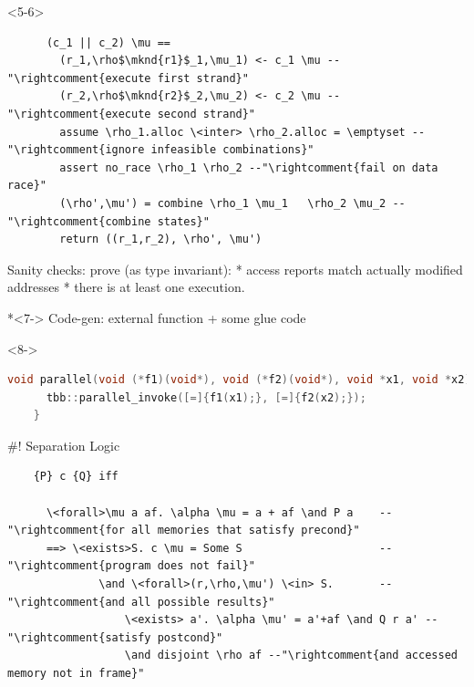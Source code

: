 \documentclass[fleqn]{beamer}
\begin{document}
    \begin{onlyenv}<5-6>
    \begin{lstlisting}
      (c_1 || c_2) \mu ==
        (r_1,\rho$\mknd{r1}$_1,\mu_1) <- c_1 \mu --"\rightcomment{execute first strand}"
        (r_2,\rho$\mknd{r2}$_2,\mu_2) <- c_2 \mu --"\rightcomment{execute second strand}"
        assume \rho_1.alloc \<inter> \rho_2.alloc = \emptyset --"\rightcomment{ignore infeasible combinations}"
        assert no_race \rho_1 \rho_2 --"\rightcomment{fail on data race}"
        (\rho',\mu') = combine \rho_1 \mu_1   \rho_2 \mu_2 --"\rightcomment{combine states}"
        return ((r_1,r_2), \rho', \mu')
    \end{lstlisting}

    Sanity checks: prove (as type invariant):
      * access reports match actually modified addresses
      * there is at least one execution.


%

    \end{onlyenv}
  *<7-> Code-gen: external function + some glue code
    \begin{onlyenv}<8->
    \small
    \begin{lstlisting}[language=C++]
    void parallel(void (*f1)(void*), void (*f2)(void*), void *x1, void *x2) {
      tbb::parallel_invoke([=]{f1(x1);}, [=]{f2(x2);});
    }
    \end{lstlisting}
    \end{onlyenv}


#! Separation Logic
  \begin{lstlisting}
    {P} c {Q} iff

      \<forall>\mu a af. \alpha \mu = a + af \and P a    --"\rightcomment{for all memories that satisfy precond}"
      ==> \<exists>S. c \mu = Some S                     --"\rightcomment{program does not fail}"
              \and \<forall>(r,\rho,\mu') \<in> S.       --"\rightcomment{and all possible results}"
                  \<exists> a'. \alpha \mu' = a'+af \and Q r a' --"\rightcomment{satisfy postcond}"
                  \and disjoint \rho af --"\rightcomment{and accessed memory not in frame}"

  \end{lstlisting}
\end{document}
